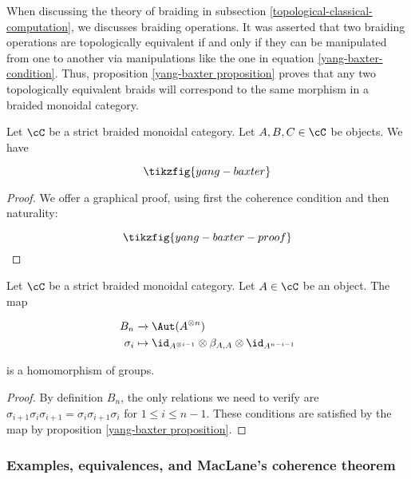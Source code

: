 \begin{rem} When discussing the theory of braiding in subsection \ref{topological-classical-computation}, we discusses braiding operations. It was asserted that two braiding operations are topologically equivalent if and only if they can be manipulated from one to another via manipulations like the one in equation \ref{yang-baxter-condition}. Thus, proposition \ref{yang-baxter proposition} proves that any two topologically equivalent braids will correspond to the same morphism in a braided monoidal category.
\end{rem}

\begin{prop}\label{yang-baxter proposition} Let $\cC$ be a strict braided monoidal category. Let $A,B,C\in \cC$ be objects. We have

\begin{equation}\label{yang-baxter-condition}
\tikzfig{yang-baxter}
\end{equation}

\end{prop} 
\begin{proof} We offer a graphical proof, using first the coherence condition and then naturality:


\begin{equation*}
\tikzfig{yang-baxter-proof}
\end{equation*}
\end{proof}

\begin{cor}\label{braid-group-rep-prop} Let $\cC$ be a strict braided monoidal category. Let $A\in \cC$ be an object. The map

\begin{align*}
B_n &\xrightarrow{} \Aut(A^{\otimes n})\\
\sigma_{i} & \mapsto \id_{A^{\otimes i-1}} \otimes \beta_{A,A}\otimes \id_{A^{n-i-1}}
\end{align*}

is a homomorphism of groups.
\end{cor}
\begin{proof} By definition $B_n$, the only relations we need to verify are $\sigma_{i+1}\sigma_{i}\sigma_{i+1}=\sigma_{i}\sigma_{i+1}\sigma_{i}$ for $1\leq i\leq n-1$. These conditions are satisfied by the map by proposition \ref{yang-baxter proposition}.
\end{proof}

\subsubsection{Examples, equivalences, and MacLane's coherence theorem}

